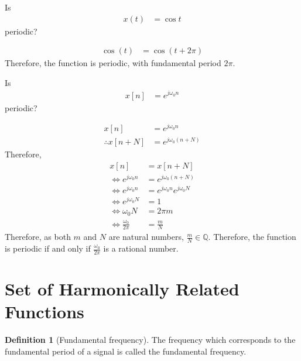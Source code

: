 \documentclass[titlepage, fleqn, a4paper, 12pt, twoside]{article}
\theoremstyle{definition}
\newtheorem{definition}{Definition}
\theoremstyle{theorem}
\begin{document}
\begin{question}
	Is
	\begin{align*}
		x(t) & = \cos t
	\end{align*}
	periodic?
\end{question}

\begin{solution}
	\begin{align*}
		\cos(t) & = \cos(t + 2 \pi)
	\end{align*}
	Therefore, the function is periodic, with fundamental period $2 \pi$.
\end{solution}

\begin{question}
	Is
	\begin{align*}
		x[n] & = e^{j \omega_0 n}
	\end{align*}
	periodic?
\end{question}

\begin{solution}
	\begin{align*}
		x[n]                & = e^{j \omega_0 n} \\
		\therefore x[n + N] & = e^{j \omega_0 (n + N)}
	\end{align*}
	Therefore,
	\begin{align*}
		x[n]                        & = x[n + N]                          \\
		\iff e^{j \omega_0 n}       & = e^{j \omega_0 (n + N)}            \\
		\iff e^{j \omega_0 n}       & = e^{j \omega_0 n} e^{j \omega_0 N} \\
		\iff e^{j \omega_0 N}       & = 1                                 \\
		\iff \omega_0 N             & = 2 \pi m                           \\
		\iff \frac{\omega_0}{2 \pi} & = \frac{m}{N}
	\end{align*}
	Therefore, as both $m$ and $N$ are natural numbers, $\frac{m}{N} \in \mathbb{Q}$.
	Therefore, the function is periodic if and only if $\frac{\omega_0}{2 \pi}$ is a rational number.
\end{solution}

\section{Set of Harmonically Related Functions}

\begin{definition}[Fundamental frequency]
	The frequency which corresponds to the fundamental period of a signal is called the fundamental frequency.
\end{definition}
\end{document}

